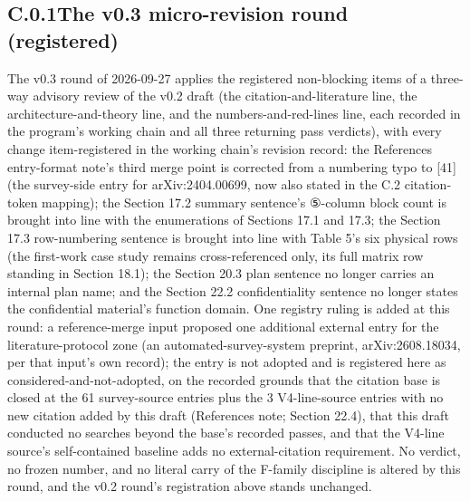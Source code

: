 \documentclass[11pt]{article}
\begin{document}
\subsection*{C.0.1\quad The v0.3 micro-revision round (registered)}
\noindent The v0.3 round of 2026-09-27 applies the registered non-blocking items of a three-way advisory review of the v0.2 draft (the citation-and-literature line, the architecture-and-theory line, and the numbers-and-red-lines line, each recorded in the program's working chain and all three returning pass verdicts), with every change item-registered in the working chain's revision record: the References entry-format note's third merge point is corrected from a numbering typo to [41] (the survey-side entry for arXiv:2404.00699, now also stated in the C.2 citation-token mapping); the Section 17.2 summary sentence's ⑤-column block count is brought into line with the enumerations of Sections 17.1 and 17.3; the Section 17.3 row-numbering sentence is brought into line with Table 5's six physical rows (the first-work case study remains cross-referenced only, its full matrix row standing in Section 18.1); the Section 20.3 plan sentence no longer carries an internal plan name; and the Section 22.2 confidentiality sentence no longer states the confidential material's function domain. One registry ruling is added at this round: a reference-merge input proposed one additional external entry for the literature-protocol zone (an automated-survey-system preprint, arXiv:2608.18034, per that input's own record); the entry is not adopted and is registered here as considered-and-not-adopted, on the recorded grounds that the citation base is closed at the 61 survey-source entries plus the 3 V4-line-source entries with no new citation added by this draft (References note; Section 22.4), that this draft conducted no searches beyond the base's recorded passes, and that the V4-line source's self-contained baseline adds no external-citation requirement. No verdict, no frozen number, and no literal carry of the F-family discipline is altered by this round, and the v0.2 round's registration above stands unchanged.\par
\end{document}
